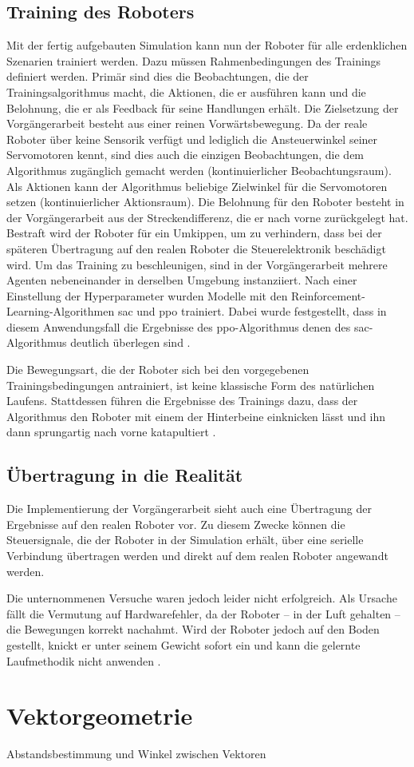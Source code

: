 \subsection{Training des Roboters}
Mit der fertig aufgebauten Simulation kann nun der Roboter für alle erdenklichen Szenarien trainiert werden.
Dazu müssen Rahmenbedingungen des Trainings definiert werden.
Primär sind dies die Beobachtungen, die der Trainingsalgorithmus macht, die Aktionen, die er ausführen kann und die Belohnung, die er als Feedback für seine Handlungen erhält.
Die Zielsetzung der Vorgängerarbeit besteht aus einer reinen Vorwärtsbewegung.
Da der reale Roboter über keine Sensorik verfügt und lediglich die Ansteuerwinkel seiner Servomotoren kennt, sind dies auch die einzigen Beobachtungen, die dem Algorithmus zugänglich gemacht werden (kontinuierlicher Beobachtungsraum).
Als Aktionen kann der Algorithmus beliebige Zielwinkel für die Servomotoren setzen (kontinuierlicher Aktionsraum).
Die Belohnung für den Roboter besteht in der Vorgängerarbeit aus der Streckendifferenz, die er nach vorne zurückgelegt hat.
Bestraft wird der Roboter für ein Umkippen, um zu verhindern, dass bei der späteren Übertragung auf den realen Roboter die Steuerelektronik beschädigt wird.
Um das Training zu beschleunigen, sind in der Vorgängerarbeit mehrere Agenten nebeneinander in derselben Umgebung instanziiert.
Nach einer Einstellung der Hyperparameter wurden Modelle mit den Reinforcement-Learning-Algorithmen \ac{sac} und \ac{ppo} trainiert.
Dabei wurde festgestellt, dass in diesem Anwendungsfall die Ergebnisse des \ac{ppo}-Algorithmus denen des \ac{sac}-Algorithmus deutlich überlegen sind \cite[48]{waidner.2020}.

Die Bewegungsart, die der Roboter sich bei den vorgegebenen Trainingsbedingungen antrainiert, ist keine klassische Form des natürlichen Laufens.
Stattdessen führen die Ergebnisse des Trainings dazu, dass der Algorithmus den Roboter mit einem der Hinterbeine einknicken lässt und ihn dann sprungartig nach vorne katapultiert \cite[51]{waidner.2020}.

\subsection{Übertragung in die Realität}
Die Implementierung der Vorgängerarbeit sieht auch eine Übertragung der Ergebnisse auf den realen Roboter vor.
Zu diesem Zwecke können die Steuersignale, die der Roboter in der Simulation erhält, über eine serielle Verbindung übertragen werden und direkt auf dem realen Roboter angewandt werden.

Die unternommenen Versuche waren jedoch leider nicht erfolgreich.
Als Ursache fällt die Vermutung auf Hardwarefehler, da der Roboter -- in der Luft gehalten -- die Bewegungen korrekt nachahmt.
Wird der Roboter jedoch auf den Boden gestellt, knickt er unter seinem Gewicht sofort ein und kann die gelernte Laufmethodik nicht anwenden \cite[58]{waidner.2020}.

\section{Vektorgeometrie}
Abstandsbestimmung und Winkel zwischen Vektoren